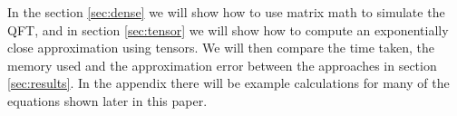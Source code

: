 \vspace{\baselineskip}
\noindent
In the section \ref{sec:dense} we will show how to use matrix math to simulate the QFT, and in section \ref{sec:tensor} we will show how to compute an exponentially close approximation using tensors. We will then compare the time taken, the memory used and the approximation error between the approaches in section \ref{sec:results}. In the appendix there will be example calculations for many of the equations shown later in this paper. 
